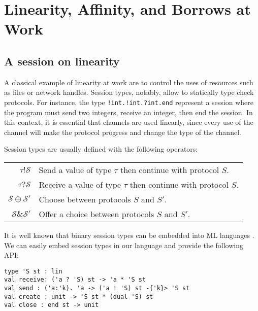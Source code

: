\section{Linearity, Affinity, and Borrows at Work}


\subsection{A session on linearity}

A classical example of linearity at work are to control the uses of resources such
as files or network handles.
%
Session types, notably, allow to statically type check protocols.
For instance, the type \lstinline{!int.!int.?int.end} represent a session
where the program must send two integers, receive an integer, then end the session.
%
In this context, it is essential that channels
are used linearly, since every use of the channel
will make the protocol progress and change the type of the channel.

Session types are usually defined with the following operators:

\begin{center}
  \begin{tabular}{r l}
    $\tau ! \mathcal S$ & Send a value of type $\tau$ then continue with protocol $S$.\\
    $\tau ? \mathcal S$& Receive a value of type $\tau$ then continue with protocol $S$.\\
    $\mathcal S \oplus \mathcal S'$& Choose between protocols $S$ and $S'$.\\
    $\mathcal S \operatorname{\&} \mathcal S'$& Offer a choice between protocols $S$ and $S'$.
  \end{tabular}
\end{center}

It is well known that binary session types can be embedded into ML languages
\cite{DBLP:journals/jfp/Padovani17}. We can easily
embed session types in our language and provide the following API:
%
\begin{lstlisting}
type 'S st : lin
val receive: ('a ? 'S) st -> 'a * 'S st
val send : ('a:'k). 'a -> ('a ! 'S) st -{'k}> 'S st
val create : unit -> 'S st * (dual 'S) st
val close : end st -> unit
\end{lstlisting}



